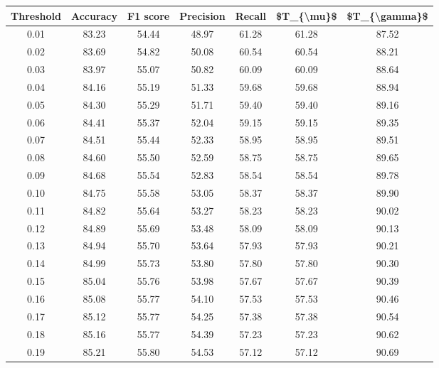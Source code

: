 \begin{tabular}{|c|c|c|c|c|c|c|}
\hline
 Threshold &  Accuracy &  F1 score &  Precision &  Recall &  \$T\_\{\textbackslash mu\}\$ &  \$T\_\{\textbackslash gamma\}\$ \\
\hline
      0.01 &     83.23 &     54.44 &      48.97 &   61.28 &      61.28 &         87.52 \\
      0.02 &     83.69 &     54.82 &      50.08 &   60.54 &      60.54 &         88.21 \\
      0.03 &     83.97 &     55.07 &      50.82 &   60.09 &      60.09 &         88.64 \\
      0.04 &     84.16 &     55.19 &      51.33 &   59.68 &      59.68 &         88.94 \\
      0.05 &     84.30 &     55.29 &      51.71 &   59.40 &      59.40 &         89.16 \\
      0.06 &     84.41 &     55.37 &      52.04 &   59.15 &      59.15 &         89.35 \\
      0.07 &     84.51 &     55.44 &      52.33 &   58.95 &      58.95 &         89.51 \\
      0.08 &     84.60 &     55.50 &      52.59 &   58.75 &      58.75 &         89.65 \\
      0.09 &     84.68 &     55.54 &      52.83 &   58.54 &      58.54 &         89.78 \\
      0.10 &     84.75 &     55.58 &      53.05 &   58.37 &      58.37 &         89.90 \\
      0.11 &     84.82 &     55.64 &      53.27 &   58.23 &      58.23 &         90.02 \\
      0.12 &     84.89 &     55.69 &      53.48 &   58.09 &      58.09 &         90.13 \\
      0.13 &     84.94 &     55.70 &      53.64 &   57.93 &      57.93 &         90.21 \\
      0.14 &     84.99 &     55.73 &      53.80 &   57.80 &      57.80 &         90.30 \\
      0.15 &     85.04 &     55.76 &      53.98 &   57.67 &      57.67 &         90.39 \\
      0.16 &     85.08 &     55.77 &      54.10 &   57.53 &      57.53 &         90.46 \\
      0.17 &     85.12 &     55.77 &      54.25 &   57.38 &      57.38 &         90.54 \\
      0.18 &     85.16 &     55.77 &      54.39 &   57.23 &      57.23 &         90.62 \\
      0.19 &     85.21 &     55.80 &      54.53 &   57.12 &      57.12 &         90.69 \\

\end{tabular}

